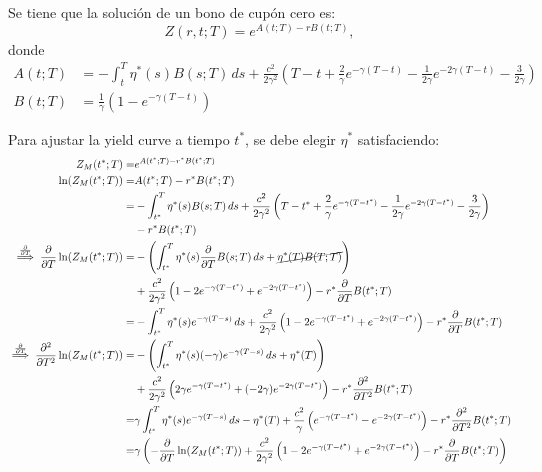 Se tiene que la solución de un bono de cupón cero es:
\begin{equation*}
    Z(r, t; T) = e^{A(t;T) - r B(t;T)},
\end{equation*}
donde
\begin{align*}
    A(t; T) &= -\int_t^T \eta^*(s) B(s; T)\,ds + \frac{c^2}{2\gamma^2} \left( T-t + \frac{2}{\gamma}e^{-\gamma(T-t)} - \frac{1}{2\gamma}e^{-2\gamma(T-t)} - \frac{3}{2\gamma} \right) \\
    B(t; T) &= \frac{1}{\gamma}\left(1 - e^{-\gamma(T-t)}\right)
\end{align*}

Para ajustar la yield curve a tiempo $t^*$, se debe elegir $\eta^*$ satisfaciendo:
\begin{align*}
    Z_M(t^*; T) =& e^{A(t^*;T) - r^* B(t^*;T)} \\
    \ln(Z_M(t^*; T)) =& A(t^*; T) - r^* B(t^*; T) \\
    =& -\int_{t^*}^T \eta^*(s) B(s; T)\,ds + \frac{c^2}{2\gamma^2} \left( T-t^* + \frac{2}{\gamma}e^{-\gamma(T-t^*)} - \frac{1}{2\gamma}e^{-2\gamma(T-t^*)} - \frac{3}{2\gamma} \right) \\
    &- r^* B(t^*; T) \\
    \overset{\frac{\partial}{\partial T}}{\implies} \frac{\partial}{\partial T}\ln(Z_M(t^*; T)) =& - \left( \int_{t^*}^T \eta^*(s) \frac{\partial}{\partial T} B(s; T)\,ds + \cancel{\eta^*(T) B(T; T)} \right) \\
    &+ \frac{c^2}{2\gamma^2} \left( 1 - 2e^{-\gamma(T-t^*)} + e^{-2\gamma(T-t^*)} \right) - r^* \frac{\partial}{\partial T} B(t^*; T) \\
    =& - \int_{t^*}^T \eta^*(s) e^{-\gamma(T-s)}\,ds + \frac{c^2}{2\gamma^2} \left( 1 - 2e^{-\gamma(T-t^*)} + e^{-2\gamma(T-t^*)} \right) - r^* \frac{\partial}{\partial T} B(t^*; T) \\
    \overset{\frac{\partial}{\partial T}}{\implies} \frac{\partial^2}{\partial T^2}\ln(Z_M(t^*; T)) =& - \left( \int_{t^*}^T \eta^*(s) (-\gamma) e^{-\gamma(T-s)}\,ds + \eta^*(T) \right) \\
    &+ \frac{c^2}{2\gamma^2} \left( 2\gamma e^{-\gamma(T-t^*)} + (-2\gamma) e^{-2\gamma(T-t^*)}  \right) - r^* \frac{\partial^2}{\partial T^2} B(t^*; T) \\
    =& \gamma \int_{t^*}^T \eta^*(s) e^{-\gamma(T-s)}\,ds - \eta^*(T) + \frac{c^2}{\gamma} \left( e^{-\gamma(T-t^*)} - e^{-2\gamma(T-t^*)} \right)  - r^* \frac{\partial^2}{\partial T^2} B(t^*; T) \\
    =& \gamma \left( -\frac{\partial}{\partial T}\ln(Z_M(t^*; T)) + \frac{c^2}{2\gamma^2} \left( 1 - 2e^{-\gamma(T-t^*)} + e^{-2\gamma(T-t^*)} \right)  - r^* \frac{\partial}{\partial T} B(t^*; T) \right) \\

\end{align*}
